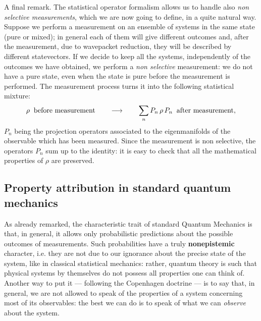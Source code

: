 \documentclass[12pt]{article}
\begin{document}
A final remark. The statistical operator formalism allows us to
handle also {\it non selective measurements}, which we are now
going to define, in a quite natural way. Suppose we perform a
measurement on an ensemble of systems in the same state (pure or
mixed); in general each of them will give different outcomes and,
after the measurement, due to wavepacket reduction, they will be
described by different statevectors. If we decide to keep all the
systems, independently of the outcomes we have obtained, we
perform a {\it non selective} measurement: we do not have a pure
state, even when the state is pure before the measurement is
performed. The measurement process turns it into the following
statistical mixture:
\[
\rho \;\;\makebox{before measurement} \qquad \longrightarrow
\qquad \sum_{n} P_{n}\,\rho\,P_{n} \;\;\makebox{after
measurement},
\]
$P_{n}$ being the projection operators associated to the
eigenmanifolds of the observable which has been measured. Since
the measurement is non selective, the operators $P_{n}$ sum up to
the identity: it is easy to check that all the mathematical
properties of $\rho$ are preserved.


\subsection{Property attribution in standard quantum mechanics}
\label{sec14}

As already remarked, the characteristic trait of standard Quantum
Mechanics is that, in general, it allows only probabilistic
predictions about the possible outcomes of measurements. Such
probabilities have a truly {\bf nonepistemic} character, i.e. they
are not due to our ignorance about the precise state of the
system, like in classical statistical mechanics: rather, quantum
theory is such that physical systems by themselves do not possess
all properties one can think of. Another way to put it ---
following the Copenhagen doctrine --- is to say that, in general,
we are not allowed to speak of the properties of a system
concerning most of its observables: the best we can do is to speak
of what we can {\it observe} about the system.
\end{document}

